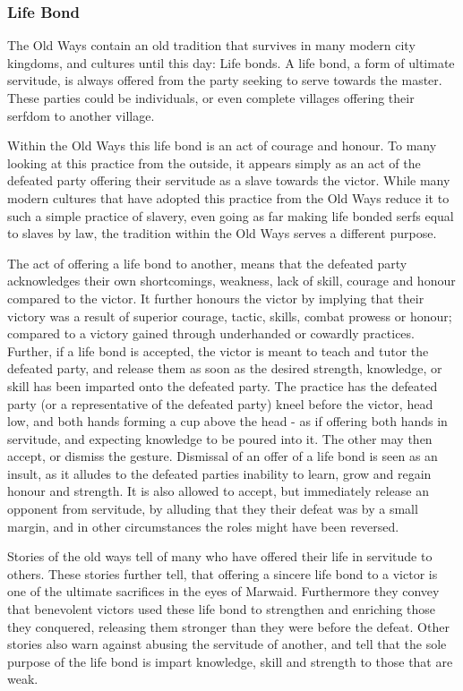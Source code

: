 \subsubsection{Life Bond}
\label{sec:Life Bond}

The Old Ways contain an old tradition that survives in many modern city
kingdoms, and cultures until this day: Life bonds. A life bond, a form of
ultimate servitude, is always offered from the party seeking to serve towards
the master. These parties could be individuals, or even complete villages
offering their serfdom to another village.

Within the Old Ways this life bond is an act of courage and honour. To many
looking at this practice from the outside, it appears simply as an act of the
defeated party offering their servitude as a slave towards the victor. While
many modern cultures that have adopted this practice from the Old Ways reduce
it to such a simple practice of slavery, even going as far making life bonded
serfs equal to slaves by law, the tradition within the Old Ways serves a
different purpose.

The act of offering a life bond to another, means that the defeated party
acknowledges their own shortcomings, weakness, lack of skill, courage and
honour compared to the victor. It further honours the victor by implying that
their victory was a result of superior courage, tactic, skills, combat prowess
or honour; compared to a victory gained through underhanded or cowardly
practices. Further, if a life bond is accepted, the victor is meant to teach
and tutor the defeated party, and release them as soon as the desired
strength, knowledge, or skill has been imparted onto the defeated party. The
practice has the defeated party (or a representative of the defeated party)
kneel before the victor, head low, and both hands forming a cup above the head
- as if offering both hands in servitude, and expecting knowledge to be poured
into it. The other may then accept, or dismiss the gesture. Dismissal of an
offer of a life bond is seen as an insult, as it alludes to the defeated
parties inability to learn, grow and regain honour and strength. It is also
allowed to accept, but immediately release an opponent from servitude, by
alluding that they their defeat was by a small margin, and in other
circumstances the roles might have been reversed.

Stories of the old ways tell of many who have offered their life in servitude
to others. These stories further tell, that offering a sincere life bond to a
victor is one of the ultimate sacrifices in the eyes of Marwaid. Furthermore
they convey that benevolent victors used these life bond to strengthen
and enriching those they conquered, releasing them stronger than they were
before the defeat. Other stories also warn against abusing the servitude of
another, and tell that the sole purpose of the life bond is impart knowledge,
skill and strength to those that are weak.

